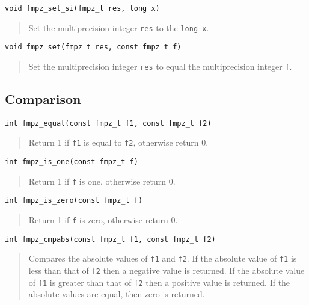 \documentclass[a4paper,10pt]{article}
\newcommand{\code}{\lstinline}
\begin{document}
\begin{lstlisting}
void fmpz_set_si(fmpz_t res, long x)
\end{lstlisting}
\begin{quote}
Set the multiprecision integer \code{res} to the \code{long x}.
\end{quote}

\begin{lstlisting}
void fmpz_set(fmpz_t res, const fmpz_t f)
\end{lstlisting}
\begin{quote}
Set the multiprecision integer \code{res} to equal the multiprecision integer \code{f}.
\end{quote}

\subsection{Comparison}

\begin{lstlisting}
int fmpz_equal(const fmpz_t f1, const fmpz_t f2)
\end{lstlisting}
\begin{quote}
Return 1 if \code{f1} is equal to \code{f2}, otherwise return 0.
\end{quote}

\begin{lstlisting}
int fmpz_is_one(const fmpz_t f)
\end{lstlisting}
\begin{quote}
Return 1 if \code{f} is one, otherwise return 0.
\end{quote}

\begin{lstlisting}
int fmpz_is_zero(const fmpz_t f)
\end{lstlisting}
\begin{quote}
Return 1 if \code{f} is zero, otherwise return 0.
\end{quote}

\begin{lstlisting}
int fmpz_cmpabs(const fmpz_t f1, const fmpz_t f2)
\end{lstlisting}
\begin{quote}
Compares the absolute values of \code{f1} and \code{f2}. If the absolute value of \code{f1} is less than that of \code{f2} then a negative value is returned. If the absolute value of \code{f1} is greater than that of \code{f2} then a positive value is returned. If the absolute values are equal, then zero is returned. 
\end{quote}
\end{document}
